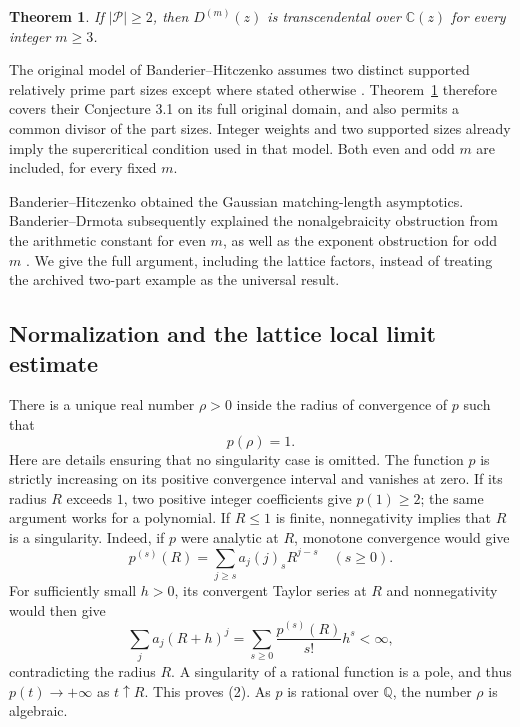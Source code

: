 \documentclass[11pt,a4paper]{article}
\numberwithin{equation}{section}
\newtheorem{theorem}{Theorem}[section]
\theoremstyle{definition}
\theoremstyle{remark}
\begin{document}
\begin{theorem}\label{add43taisho:r43:main}
If $|\mathcal P|\ge2$, then $D^{(m)}(z)$ is transcendental over
$\mathbb C(z)$ for every integer $m\ge3$.
\end{theorem}

The original model of Banderier--Hitczenko assumes two distinct supported
relatively prime part sizes except where stated otherwise
\cite[Section 2]{add43taisho:r43:BH}.  Theorem~\ref{add43taisho:r43:main} therefore covers their
Conjecture 3.1 on its full original domain, and also permits a common divisor
of the part sizes.  Integer weights and two supported sizes already imply
the supercritical condition used in that model.  Both even and odd $m$ are
included, for every fixed $m$.

Banderier--Hitczenko obtained the Gaussian matching-length asymptotics.
Banderier--Drmota subsequently explained the nonalgebraicity obstruction
from the arithmetic constant for even $m$, as well as the exponent
obstruction for odd $m$ \cite[Proposition 7]{add43taisho:r43:BD}.
We give the full argument, including the lattice factors, instead of
treating the archived two-part example as the universal result.

\subsection{Normalization and the lattice local limit estimate}

There is a unique real number $\rho>0$ inside the radius of convergence of
$p$ such that
\[
                         p(\rho)=1.                  \tag{2}
\]
Here are details ensuring that no singularity case is omitted.
The function $p$ is strictly increasing on its positive convergence
interval and vanishes at zero.  If its radius $R$ exceeds $1$, two
positive integer coefficients give $p(1)\ge2$; the same argument works
for a polynomial.  If $R\le1$ is finite, nonnegativity implies that $R$
is a singularity.  Indeed, if $p$ were analytic at $R$, monotone
convergence would give
\[
 p^{(s)}(R)=\sum_{j\ge s}a_j(j)_sR^{j-s}\quad(s\ge0).
\]
For sufficiently small $h>0$, its convergent Taylor series at $R$ and
nonnegativity would then give
\[
 \sum_j a_j(R+h)^j
   =\sum_{s\ge0}\frac{p^{(s)}(R)}{s!}h^s<\infty,
\]
contradicting the radius $R$.  A singularity of a rational function is a
pole, and thus $p(t)\to+\infty$ as $t\uparrow R$.  This proves (2).
As $p$ is rational over $\mathbb Q$, the number $\rho$ is algebraic.
\end{document}
